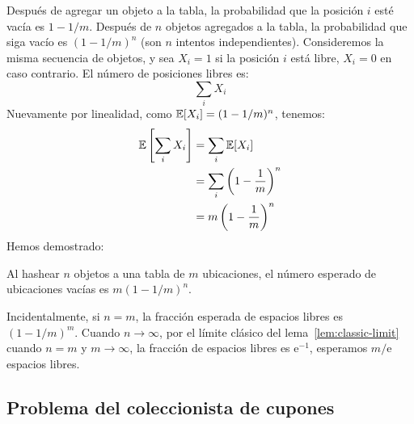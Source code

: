   Después de agregar un objeto a la tabla,
  la probabilidad que la posición \(i\) esté vacía es \(1 - 1/m\).
  Después de \(n\) objetos agregados a la tabla,
  la probabilidad que siga vacío es \((1 - 1/m)^n\)
  (son \(n\) intentos independientes).
  Consideremos la misma secuencia de objetos,
  y sea \(X_i = 1\) si la posición \(i\) está libre,
  \(X_i = 0\) en caso contrario.
  El número de posiciones libres es:
  \begin{equation*}
    \sum_i X_i
  \end{equation*}
  Nuevamente por linealidad,
  como \(\operatorname{\mathbb{E}}[ X_i ] = (1 - 1/m)^n\),
  tenemos:
  \begin{align*}
    \operatorname{\mathbb{E}}\left[ \sum_i X_i \right]
      &= \sum_i \operatorname{\mathbb{E}}[X_i] \\
      &= \sum_i \left( 1 - \frac{1}{m} \right)^n \\
      &= m \left( 1 - \frac{1}{m} \right)^n
  \end{align*}
  Hemos demostrado:
  \begin{theorem}
    \label{theo:hash-expected-free}
    Al hashear \(n\) objetos a una tabla de \(m\) ubicaciones,
    el número esperado de ubicaciones vacías es \(m (1 - 1/m)^n\).
  \end{theorem}
  Incidentalmente,
  si \(n = m\),
  la fracción esperada de espacios libres es \((1 - 1/m)^m\).
  Cuando \(n \to \infty\),
  por el límite clásico del lema~\ref{lem:classic-limit}
  cuando \(n = m\) y \(m \to \infty\),
  la fracción de espacios libres es \(\mathrm{e}^{-1}\),
  esperamos \(m/\mathrm{e}\) espacios libres.

\subsection{Problema del coleccionista de cupones}
\label{sec:coupon-collector}

